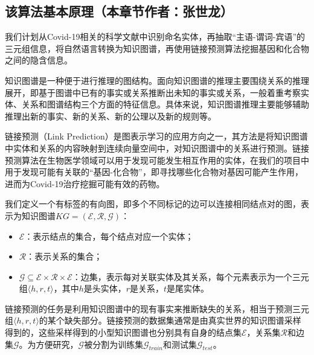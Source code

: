 \documentclass[twocolumn]{article}
\begin{document}
\subsection{该算法基本原理（本章节作者：张世龙）}
我们计划从Covid-19相关的科学文献中识别命名实体，再抽取“主语-谓词-宾语”的三元组信息，将自然语言转换为知识图谱，再使用链接预测算法挖掘基因和化合物之间的隐含信息。\par
知识图谱是一种便于进行推理的图结构。面向知识图谱的推理主要围绕关系的推理展开，即基于图谱中已有的事实或关系推断出未知的事实或关系，一般着重考察实体、关系和图谱结构三个方面的特征信息。具体来说，知识图谱推理主要能够辅助推理出新的事实、新的关系、新的公理以及新的规则等。\par
链接预测（Link Prediction）是图表示学习的应用方向之一，其方法是将知识图谱中实体和关系的内容映射到连续向量空间中，对知识图谱中的关系进行预测。链接预测算法在生物医学领域可以用于发现可能发生相互作用的实体，在我们的项目中用于发现可能有关联的“基因-化合物”，即寻找哪些化合物对基因可能产生作用，进而为Covid-19治疗挖掘可能有效的药物。\par
我们定义一个有标签的有向图，即多个不同标记的边可以连接相同结点对的图，表示为知识图谱$KG=(\mathcal{E}, \mathcal{R}, \mathcal{G})$\cite{link_prediction}：
\begin{itemize}
	\item $\mathcal{E}$：表示结点的集合，每个结点对应一个实体；
	\item $\mathcal{R}$：表示关系的集合；
	\item $\mathcal{G} \subseteq \mathcal{E} \times \mathcal{R} \times \mathcal{E}$：边集，表示每对关联实体及其关系，每个元素表示为一个三元组$\langle h, r, t\rangle$，其中$h$是头实体，$r$是关系，$t$是尾实体。
\end{itemize}\par
链接预测的任务是利用知识图谱中的现有事实来推断缺失的关系，相当于预测三元组$\langle h, r, t\rangle$的某个缺失部分。链接预测的数据集通常是由真实世界的知识图谱采样得到的，这些采样得到的小型知识图谱也分别具有自身的结点集$\mathcal{E}$，关系集$\mathcal{R}$和边集$\mathcal{G}$。为方便研究，$\mathcal{G}$被分割为训练集$\mathcal{G}_{train}$和测试集$\mathcal{G}_{test}$。\par
\end{document}

